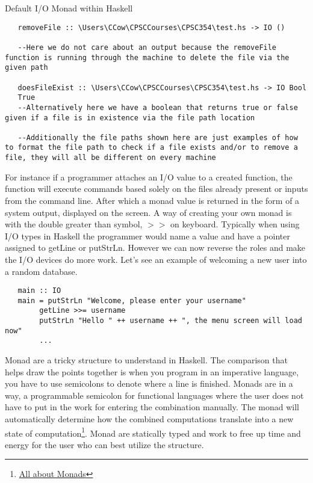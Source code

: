 \documentclass{article}
\begin{document}
\medskip
\caption{Default I/O Monad within Haskell}
\begin{lstlisting}
   removeFile :: \Users\CCow\CPSCCourses\CPSC354\test.hs -> IO ()
   
   --Here we do not care about an output because the removeFile function is running through the machine to delete the file via the given path
   
   doesFileExist :: \Users\CCow\CPSCCourses\CPSC354\test.hs -> IO Bool
   True
   --Alternatively here we have a boolean that returns true or false given if a file is in existence via the file path location
   
   --Additionally the file paths shown here are just examples of how to format the file path to check if a file exists and/or to remove a file, they will all be different on every machine
\end{lstlisting}

\noindent For instance if a programmer attaches an I/O value to a created function, the function will execute commands based solely on the files already present or inputs from the command line. After which a monad value is returned in the form of a system output, displayed on the screen. A way of creating your own monad is with the double greater than symbol, $>>$ on keyboard. Typically when using I/O types in Haskell the programmer would name a value and have a pointer assigned to getLine or putStrLn. However we can now reverse the roles and make the I/O devices do more work. Let's see an example of welcoming a new user into a random database.

\begin{lstlisting}
   main :: IO
   main = putStrLn "Welcome, please enter your username"
        getLine >>= username
        putStrLn "Hello " ++ username ++ ", the menu screen will load now" 
        ...
\end{lstlisting}

\noindent Monad are a tricky structure to understand in Haskell. The comparison that helps draw the points together is when you program in an imperative language, you have to use semicolons to denote where a line is finished. Monads are in a way, a programmable semicolon for functional languages where the user does not have to put in the work for entering the combination manually. The monad will automatically determine how the combined computations translate into a new state of computation\footnote{\href{https://wiki.haskell.org/All_About_Monads}{All about Monads}}. Monad are statically typed and work to free up time and energy for the user who can best utilize the structure.
\end{document}
